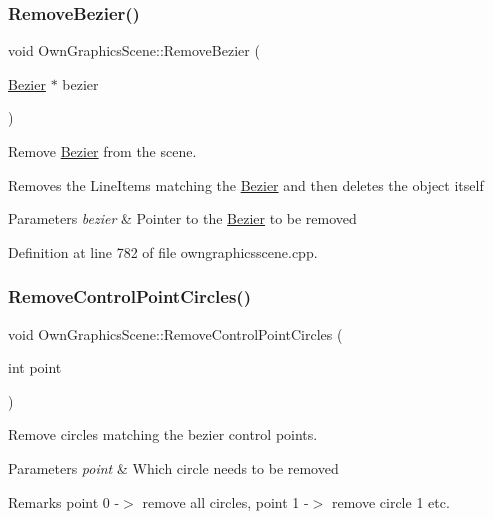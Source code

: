 \subsubsection{\texorpdfstring{Remove\+Bezier()}{RemoveBezier()}}
{\footnotesize\ttfamily void Own\+Graphics\+Scene\+::\+Remove\+Bezier (\begin{DoxyParamCaption}\item[{\mbox{\hyperlink{classBezier}{Bezier}} $\ast$}]{bezier }\end{DoxyParamCaption})}



Remove \mbox{\hyperlink{classBezier}{Bezier}} from the scene. 

Removes the Line\+Items matching the \mbox{\hyperlink{classBezier}{Bezier}} and then deletes the object itself 
\begin{DoxyParams}{Parameters}
{\em bezier} & Pointer to the \mbox{\hyperlink{classBezier}{Bezier}} to be removed \\
\hline
\end{DoxyParams}


Definition at line 782 of file owngraphicsscene.\+cpp.

\mbox{\label{classOwnGraphicsScene_ad6ad8eaab22c10b1a228f08d8bd5bb68}} 
\subsubsection{\texorpdfstring{Remove\+Control\+Point\+Circles()}{RemoveControlPointCircles()}}
{\footnotesize\ttfamily void Own\+Graphics\+Scene\+::\+Remove\+Control\+Point\+Circles (\begin{DoxyParamCaption}\item[{int}]{point }\end{DoxyParamCaption})}



Remove circles matching the bezier control points. 


\begin{DoxyParams}{Parameters}
{\em point} & Which circle needs to be removed \\
\hline
\end{DoxyParams}
\begin{DoxyRemark}{Remarks}
point 0 -\/$>$ remove all circles, point 1 -\/$>$ remove circle 1 etc. 
\end{DoxyRemark}



